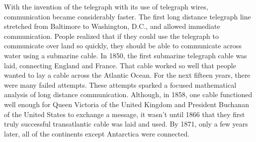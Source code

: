 With the invention of the telegraph with its use of telegraph wires, communication became considerably faster. The first long distance telegraph line stretched from Baltimore to Washington, D.C., and allowed immediate communication. People realized that if they could use the telegraph to communicate over land so quickly, they should be able to communicate across water using a submarine cable. In 1850, the first submarine telegraph cable was laid, connecting England and France. That cable worked so well that people wanted to lay a cable across the Atlantic Ocean. For the next fifteen years, there were many failed attempts. These attempts sparked a focused mathematical analysis of long distance communication.  Although, in 1858, one cable functioned well enough for Queen Victoria of the United Kingdom and President Buchanan of the United States to exchange a message, it wasn't until 1866 that they first truly successful transatlantic cable was laid and used. By 1871, only a few years later, all of the continents except Antarctica were connected.




